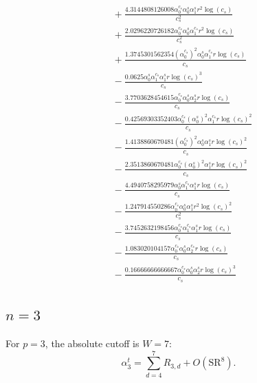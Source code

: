 \documentclass[10pt]{article}
\begin{document}
\begin{align*}
&{}  + \frac{4.3144808126008 \alpha_{0}^{c_s} \alpha_{0}^s \alpha_{1}^s r^{2} \log{\left(c_{s} \right)}}{c_{s}^{2}} \\
&{}  + \frac{2.0296220726182 \alpha_{0}^{c_s} \alpha_{0}^s \alpha_{1}^{c_s} r^{2} \log{\left(c_{s} \right)}}{c_{s}^{2}} \\
&{}  + \frac{1.3745301562354 \left(\alpha_{0}^{c_s}\right)^{2} \alpha_{0}^s \alpha_{1}^{c_s} r \log{\left(c_{s} \right)}}{c_{s}} \\
&{}  - \frac{0.0625 \alpha_{0}^s \alpha_{1}^{c_s} \alpha_{1}^s r \log{\left(c_{s} \right)}^{3}}{c_{s}} \\
&{}  - \frac{3.7703628454615 \alpha_{0}^{c_s} \alpha_{0}^s \alpha_{2}^s r \log{\left(c_{s} \right)}}{c_{s}} \\
&{}  - \frac{0.42569303352403 \alpha_{0}^{c_s} \left(\alpha_{0}^s\right)^{2} \alpha_{1}^{c_s} r \log{\left(c_{s} \right)}^{2}}{c_{s}} \\
&{}  - \frac{1.4138860670481 \left(\alpha_{0}^{c_s}\right)^{2} \alpha_{0}^s \alpha_{1}^s r \log{\left(c_{s} \right)}^{2}}{c_{s}} \\
&{}  - \frac{2.3513860670481 \alpha_{0}^{c_s} \left(\alpha_{0}^s\right)^{2} \alpha_{1}^s r \log{\left(c_{s} \right)}^{2}}{c_{s}} \\
&{}  - \frac{4.4940758295979 \alpha_{0}^s \alpha_{1}^{c_s} \alpha_{1}^s r \log{\left(c_{s} \right)}}{c_{s}} \\
&{}  - \frac{1.247914550286 \alpha_{0}^{c_s} \alpha_{0}^s \alpha_{1}^s r^{2} \log{\left(c_{s} \right)}^{2}}{c_{s}^{2}} \\
&{}  - \frac{3.7452632198456 \alpha_{0}^{c_s} \alpha_{1}^{c_s} \alpha_{1}^s r \log{\left(c_{s} \right)}}{c_{s}} \\
&{}  - \frac{1.083020104157 \alpha_{0}^{c_s} \alpha_{0}^s \alpha_{2}^{c_s} r \log{\left(c_{s} \right)}}{c_{s}} \\
&{}  - \frac{0.16666666666667 \alpha_{0}^{c_s} \alpha_{0}^s \alpha_{2}^s r \log{\left(c_{s} \right)}^{3}}{c_{s}}
\end{align*}

\subsection{$n=3$}
For $p=3$, the absolute cutoff is $W=7$:
\[\alpha_{3}^t=\sum_{d=4}^{7}R_{3,d}+O(\mathrm{SR}^{8}).\]
\end{document}
